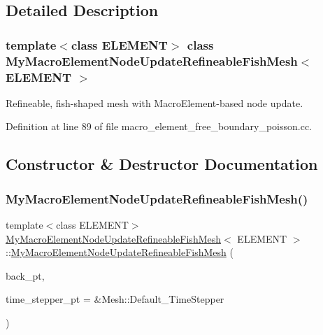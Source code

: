 \subsection{Detailed Description}
\subsubsection*{template$<$class E\+L\+E\+M\+E\+NT$>$\newline
class My\+Macro\+Element\+Node\+Update\+Refineable\+Fish\+Mesh$<$ E\+L\+E\+M\+E\+N\+T $>$}

Refineable, fish-\/shaped mesh with Macro\+Element-\/based node update. 

Definition at line 89 of file macro\+\_\+element\+\_\+free\+\_\+boundary\+\_\+poisson.\+cc.



\subsection{Constructor \& Destructor Documentation}
\mbox{\label{classMyMacroElementNodeUpdateRefineableFishMesh_aed0e3ba11f8a2b098ba4e23814135132}} 
\subsubsection{\texorpdfstring{My\+Macro\+Element\+Node\+Update\+Refineable\+Fish\+Mesh()}{MyMacroElementNodeUpdateRefineableFishMesh()}}
{\footnotesize\ttfamily template$<$class E\+L\+E\+M\+E\+NT$>$ \\
\hyperlink{classMyMacroElementNodeUpdateRefineableFishMesh}{My\+Macro\+Element\+Node\+Update\+Refineable\+Fish\+Mesh}$<$ E\+L\+E\+M\+E\+NT $>$\+::\hyperlink{classMyMacroElementNodeUpdateRefineableFishMesh}{My\+Macro\+Element\+Node\+Update\+Refineable\+Fish\+Mesh} (\begin{DoxyParamCaption}\item[{Geom\+Object $\ast$}]{back\+\_\+pt,  }\item[{Time\+Stepper $\ast$}]{time\+\_\+stepper\+\_\+pt = {\ttfamily \&Mesh\+:\+:Default\+\_\+TimeStepper} }\end{DoxyParamCaption})\hspace{0.3cm}{\ttfamily [inline]}}



